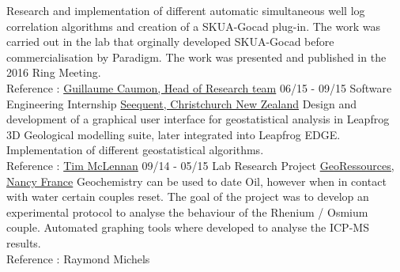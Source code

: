 \documentclass[]{friggeri-cv}
\begin{document}
\begin{entrylist}
    {Research and implementation of different automatic simultaneous well log correlation algorithms and creation of a SKUA-Gocad plug-in. The work was carried out in the lab that orginally developed SKUA-Gocad before commercialisation by Paradigm. The work was presented and published in the 2016 Ring Meeting. \\Reference : \href{mailto:Guillaume.Caumon@ensg.univ-lorraine.fr}{Guillaume Caumon, Head of Research team}}
    \entry
    {06/15 - 09/15}
    {Software Engineering Internship}
    {\href{https://www.seequent.com/}{Seequent, Christchurch New Zealand}}
    {Design and development of a graphical user interface for geostatistical analysis in Leapfrog 3D Geological modelling suite, later integrated into Leapfrog EDGE. Implementation of different geostatistical algorithms.
    \\
    Reference : \href{mailto:tim.mclennan@seequent.com}{Tim McLennan}}
	\entry
	{09/14 - 05/15}
	{Lab Research Project}
	{\href{http://georessources.univ-lorraine.fr/}{GeoRessources, Nancy France}}
	{Geochemistry can be used to date Oil, however when in contact with water certain couples reset. The goal of the project was to develop an experimental protocol to analyse the behaviour of the Rhenium / Osmium couple. Automated graphing tools where developed to analyse the ICP-MS results.
	\\
	Reference : Raymond Michels}
\end{entrylist}
\\
\newpage
\end{document}
